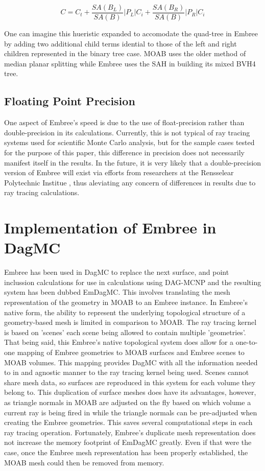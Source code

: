 \documentclass{anstrans}
\begin{document}
\begin{equation} 
C = C_{t} + \frac{SA(B_{L})}{SA(B)} |P_{L}|C_{i} +  \frac{SA(B_{R})}{SA(B)} |P_{R}|C_{i}
\end{equation}

One can imagine this hueristic expanded to accomodate the quad-tree in Embree by adding two additional child terms idential to those of the left and right children represented in the binary tree case. MOAB uses the older method of median planar splitting while Embree uses the SAH in building its mixed BVH4 tree. 

\subsection{Floating Point Precision}

One aspect of Embree's speed is due to the use of float-precision rather than double-precision in its calculations. Currently, this is not typical of ray tracing systems used for scientific Monte Carlo analysis, but for the sample cases tested for the purpose of this paper, this difference in precision does not necessarily manifest itself in the results. In the future, it is very likely that a double-precision version of Embree will exist via efforts from researchers at the Rensselear Polytechnic Institue \cite{gpu_mic_ray_tracing_rpi}, thus aleviating any concern of differences in results due to ray tracing calculations.

\section{Implementation of Embree in DagMC}

Embree has been used in DagMC to replace the next surface, and point inclussion calculations for use in calculations using DAG-MCNP and the resulting system has been dubbed EmDagMC. This involves translating the mesh representation of the geometry in MOAB to an Embree instance. In Embree's native form, the ability to represent the underlying topological structure of a geometry-based mesh is limited in comparison to MOAB. The ray tracing kernel is based on 'scenes' each scene being allowed to contain multiple 'geometries'. That being said, this Embree's native topological system does allow for a one-to-one mapping of Embree geometries to MOAB surfaces and Embree scenes to MOAB volumes. This mapping provides DagMC with all the information needed to in and agnostic manner to the ray tracing kernel being used. Scenes cannot share mesh data, so surfaces are reproduced in this system for each volume they belong to. This duplication of surface meshes does have its advantages, however, as triangle normals in MOAB are adjusted on the fly based on which volume a current ray is being fired in while the triangle normals can be pre-adjusted when creating the Embree geometries. This saves several computational steps in each ray tracing operation. Fortunately, Embree's duplicate mesh representation does not increase the memory footprint of EmDagMC greatly. Even if that were the case, once the Embree mesh representation has been properly established, the MOAB mesh could then be removed from memory.
\end{document}
